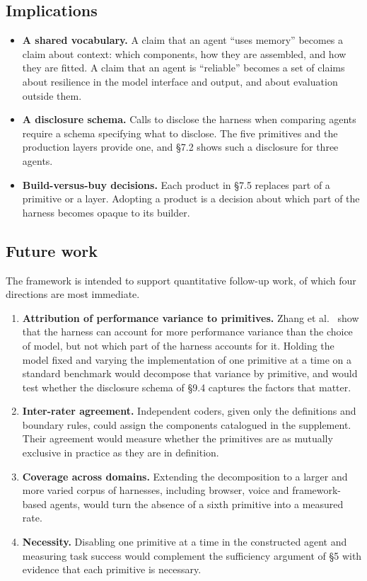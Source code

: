 \subsection{Implications}

\begin{itemize}
\tightlist
\item
  \textbf{A shared vocabulary.} A claim that an agent ``uses memory'' becomes a claim about context: which components, how they are assembled, and how they are fitted. A claim that an agent is ``reliable'' becomes a set of claims about resilience in the model interface and output, and about evaluation outside them.
\item
  \textbf{A disclosure schema.} Calls to disclose the harness when comparing agents \cite{zhang2026stop} require a schema specifying what to disclose. The five primitives and the production layers provide one, and §7.2 shows such a disclosure for three agents.
\item
  \textbf{Build-versus-buy decisions.} Each product in §7.5 replaces part of a primitive or a layer. Adopting a product is a decision about which part of the harness becomes opaque to its builder.
\end{itemize}

\subsection{Future work}

The framework is intended to support quantitative follow-up work, of which four directions are most immediate.

\begin{enumerate}
\def\labelenumi{\arabic{enumi}.}
\tightlist
\item
  \textbf{Attribution of performance variance to primitives.} Zhang et al.~\cite{zhang2026stop} show that the harness can account for more performance variance than the choice of model, but not which part of the harness accounts for it. Holding the model fixed and varying the implementation of one primitive at a time on a standard benchmark would decompose that variance by primitive, and would test whether the disclosure schema of §9.4 captures the factors that matter.
\item
  \textbf{Inter-rater agreement.} Independent coders, given only the definitions and boundary rules, could assign the components catalogued in the supplement. Their agreement would measure whether the primitives are as mutually exclusive in practice as they are in definition.
\item
  \textbf{Coverage across domains.} Extending the decomposition to a larger and more varied corpus of harnesses, including browser, voice and framework-based agents, would turn the absence of a sixth primitive into a measured rate.
\item
  \textbf{Necessity.} Disabling one primitive at a time in the constructed agent and measuring task success would complement the sufficiency argument of §5 with evidence that each primitive is necessary.
\end{enumerate}

